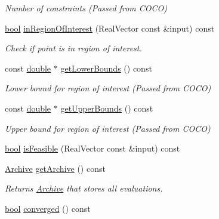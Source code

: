 \begin{DoxyCompactItemize}
\begin{DoxyCompactList}\small\item\em Number of constraints (Passed from C\+O\+CO) \end{DoxyCompactList}\item 
\hyperlink{classbool}{bool} \hyperlink{classCOCOfunc_ad6aa968a96ec542ff3696de2e982ea5d}{in\+Region\+Of\+Interest} (Real\+Vector const \&input) const
\begin{DoxyCompactList}\small\item\em Check if point is in region of interest. \end{DoxyCompactList}\item 
const \hyperlink{classdouble}{double} $\ast$ \hyperlink{classCOCOfunc_a36c4660ffc4626348b94c0ddd6e79391}{get\+Lower\+Bounds} () const\hypertarget{classCOCOfunc_a36c4660ffc4626348b94c0ddd6e79391}{}\label{classCOCOfunc_a36c4660ffc4626348b94c0ddd6e79391}

\begin{DoxyCompactList}\small\item\em Lower bound for region of interest (Passed from C\+O\+CO) \end{DoxyCompactList}\item 
const \hyperlink{classdouble}{double} $\ast$ \hyperlink{classCOCOfunc_a04a3839722b0bd6ef34b7391d1c63101}{get\+Upper\+Bounds} () const\hypertarget{classCOCOfunc_a04a3839722b0bd6ef34b7391d1c63101}{}\label{classCOCOfunc_a04a3839722b0bd6ef34b7391d1c63101}

\begin{DoxyCompactList}\small\item\em Upper bound for region of interest (Passed from C\+O\+CO) \end{DoxyCompactList}\item 
\hyperlink{classbool}{bool} \hyperlink{classCOCOfunc_a81ffc0c8318e3f2163237f6329dfd621}{is\+Feasible} (Real\+Vector const \&input) const
\item 
\hyperlink{classArchive}{Archive} \hyperlink{classCOCOfunc_aa0ed7f73c9689c5beceb67452494842e}{get\+Archive} () const\hypertarget{classCOCOfunc_aa0ed7f73c9689c5beceb67452494842e}{}\label{classCOCOfunc_aa0ed7f73c9689c5beceb67452494842e}

\begin{DoxyCompactList}\small\item\em Returns \hyperlink{classArchive}{Archive} that stores all evaluations. \end{DoxyCompactList}\item 
\hyperlink{classbool}{bool} \hyperlink{classCOCOfunc_a439fbb980cddaa9ffa900177f14c90e3}{converged} () const\hypertarget{classCOCOfunc_a439fbb980cddaa9ffa900177f14c90e3}{}\label{classCOCOfunc_a439fbb980cddaa9ffa900177f14c90e3}


\end{DoxyCompactItemize}
